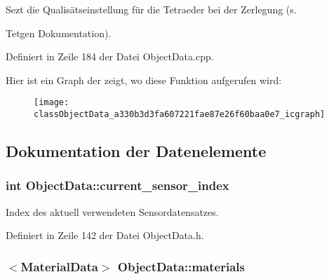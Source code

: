 Sezt die Qualisätseinstellung für die Tetraeder bei der Zerlegung (s. 

Tetgen Dokumentation). 

Definiert in Zeile 184 der Datei Object\-Data.\-cpp.



Hier ist ein Graph der zeigt, wo diese Funktion aufgerufen wird\-:\nopagebreak
\begin{figure}[H]
\begin{center}
\leavevmode
\texttt{[image: classObjectData\_a330b3d3fa607221fae87e26f60baa0e7\_icgraph]}
\end{center}
\end{figure}




\subsection{Dokumentation der Datenelemente}
\hypertarget{classObjectData_a86976d7029456ac75a3e011f11e8c5f7}{
\subsubsection[{current\-\_\-sensor\-\_\-index}]{\setlength{\rightskip}{0pt plus 5cm}int Object\-Data\-::current\-\_\-sensor\-\_\-index\hspace{0.3cm}{\ttfamily [private]}}}\label{classObjectData_a86976d7029456ac75a3e011f11e8c5f7}


Index des aktuell verwendeten Sensordatensatzes. 



Definiert in Zeile 142 der Datei Object\-Data.\-h.

\hypertarget{classObjectData_a353002eeb054efed800db1b798d08a6c}{
\subsubsection[{materials}]{$<${\bf Material\-Data}$>$ Object\-Data\-::materials\hspace{0.3cm}{\ttfamily [private]}}}\label{classObjectData_a353002eeb054efed800db1b798d08a6c}


